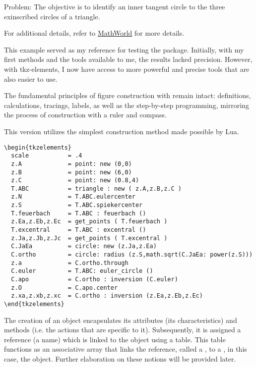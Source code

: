 \begin{mybox}{Problem:}
The objective is to identify an inner tangent circle to the three exinscribed circles of a triangle.\end{mybox}

 For additional details, refer to \href{https://mathworld.wolfram.com/ApolloniusCircle.html}{MathWorld} for more details.

This example served as my reference for testing the  package. Initially, with my first methods and the tools available to me, the results lacked precision.  However, with tkz-elements, I now have access to more powerful and precise tools that are also easier to use.

The fundamental principles of figure construction with  remain intact: definitions, calculations, tracings, labels, as well as the  step-by-step programming, mirroring the process of construction with a ruler and compass. 

This version utilizes the simplest construction method made possible by Lua.

\begin{mybox}
\begin{Verbatim}
\begin{tkzelements}
  scale           = .4
  z.A             = point: new (0,0)
  z.B             = point: new (6,0)
  z.C             = point: new (0.8,4)
  T.ABC           = triangle : new ( z.A,z.B,z.C )
  z.N             = T.ABC.eulercenter
  z.S             = T.ABC.spiekercenter
  T.feuerbach     = T.ABC : feuerbach ()
  z.Ea,z.Eb,z.Ec  = get_points ( T.feuerbach )
  T.excentral     = T.ABC : excentral ()
  z.Ja,z.Jb,z.Jc  = get_points ( T.excentral )
  C.JaEa          = circle: new (z.Ja,z.Ea)
  C.ortho         = circle: radius (z.S,math.sqrt(C.JaEa: power(z.S)))
  z.a             = C.ortho.through
  C.euler         = T.ABC: euler_circle ()
  C.apo           = C.ortho : inversion (C.euler)
  z.O             = C.apo.center
  z.xa,z.xb,z.xc  = C.ortho : inversion (z.Ea,z.Eb,z.Ec)
\end{tkzelements}
\end{Verbatim}
\end{mybox}

The creation of an object encapsulates its attributes (its characteristics) and methods (i.e. the actions that are specific to it). Subsequently, it is assigned a reference (a name) which is linked to the object using a table. This table functions as an associative array that links the reference, called a , to a , in this case, the object. Further elaboration on these notions will be provided later.

